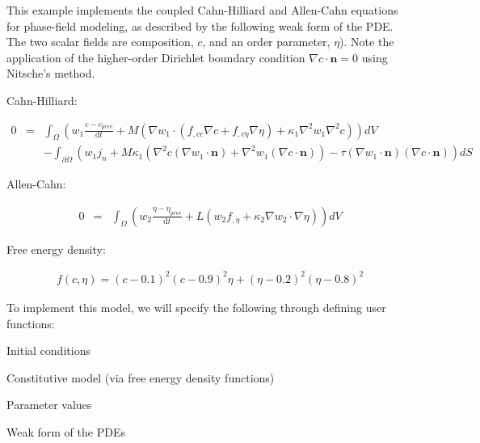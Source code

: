 

This example implements the coupled Cahn-\/\-Hilliard and Allen-\/\-Cahn equations for phase-\/field modeling, as described by the following weak form of the P\-D\-E. The two scalar fields are composition, $c$, and an order parameter, $\eta$). Note the application of the higher-\/order Dirichlet boundary condition $\nabla c\cdot\boldsymbol{n}=0$ using Nitsche's method.

Cahn-\/\-Hilliard\-:

\begin{eqnarray*} 0 &=& \int_\Omega \left(w_1\frac{c - c_{prev}}{\mathrm{d}t} + M\left(\nabla w_1\cdot(f_{,cc}\nabla c + f_{,c\eta}\nabla\eta) + \kappa_1\nabla^2 w_1\nabla^2 c\right)\right) dV\\ &\phantom{=}& - \int_{\partial\Omega} \left(w_1j_n + M\kappa_1\left(\nabla^2c(\nabla w_1\cdot\boldsymbol{n}) + \nabla^2w_1(\nabla c\cdot\boldsymbol{n})\right) - \tau(\nabla w_1\cdot\boldsymbol{n})(\nabla c\cdot\boldsymbol{n})\right) dS \end{eqnarray*}

Allen-\/\-Cahn\-:

\begin{eqnarray*} 0 &=& \int_\Omega \left(w_2\frac{\eta - \eta_{prev}}{\mathrm{d}t} + L\left(w_2 f_{,\eta} + \kappa_2\nabla w_2\cdot\nabla \eta\right)\right) dV \end{eqnarray*}

Free energy density\-:

\begin{eqnarray*} f(c,\eta) = (c - 0.1)^2(c - 0.9)^2\eta + (\eta - 0.2)^2(\eta-0.8)^2 \end{eqnarray*}

To implement this model, we will specify the following through defining user functions\-: \par

\begin{DoxyItemize}
\item Initial conditions \par

\item Constitutive model (via free energy density functions) \par

\item Parameter values \par

\item Weak form of the P\-D\-Es \par

\end{DoxyItemize}

